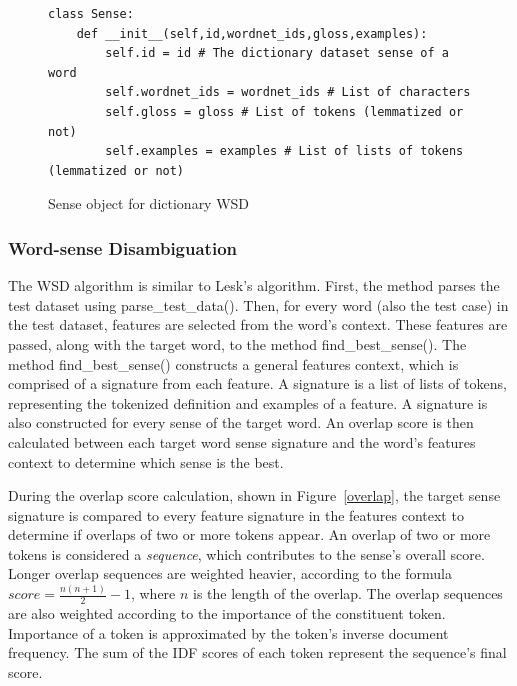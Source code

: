 \documentclass[11pt]{article}
\begin{document}
\begin{figure}[ht]
\begin{lstlisting}
class Sense:
    def __init__(self,id,wordnet_ids,gloss,examples):
        self.id = id # The dictionary dataset sense of a word
        self.wordnet_ids = wordnet_ids # List of characters
        self.gloss = gloss # List of tokens (lemmatized or not)
        self.examples = examples # List of lists of tokens (lemmatized or not)
\end{lstlisting}
\caption{Sense object for dictionary WSD}
\label{sense}
\end{figure}

\subsubsection{Word-sense Disambiguation}
The WSD algorithm is similar to Lesk's algorithm. First, the method parses the test dataset using parse\_test\_data(). Then, for every word (also the test case) in the test dataset, features are selected from the word's context. These features are passed, along with the target word, to the method find\_best\_sense(). The method find\_best\_sense() constructs a general features context, which is comprised of a signature from each feature. A signature is a list of lists of tokens, representing the tokenized definition and examples of a feature. A signature is also constructed for every sense of the target word. An overlap score is then calculated between each target word sense signature and the word's features context to determine which sense is the best. 

During the overlap score calculation, shown in Figure~\ref{overlap}, the target sense signature is compared to every feature signature in the features context to determine if overlaps of two or more tokens appear. An overlap of two or more tokens is considered a \textit{sequence}, which contributes to the sense's overall score. Longer overlap sequences are weighted heavier, according to the formula $score = \frac{n(n+1)}{2} - 1$, where $n$ is the length of the overlap. The overlap sequences are also weighted according to the importance of the constituent token. Importance of a token is approximated by the token's inverse document frequency. The sum of the IDF scores of each token represent the sequence's final score.
\end{document}
